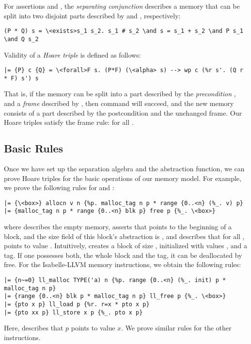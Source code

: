 \documentclass[a4paper,USenglish,cleveref, autoref]{lipics-v2019}
\begin{document}
For assertions  and , the \emph{separating conjunction}  describes a memory that can be split into two disjoint parts described by  and , respectively:
\begin{lstlisting}
(P * Q) s = \<exists>s_1 s_2. s_1 # s_2 \and s = s_1 + s_2 \and P s_1 \and Q s_2
\end{lstlisting}
%
Validity of a \emph{Hoare triple}  is defined as follows:
\begin{lstlisting}
|= {P} c {Q} = \<forall>F s. (P*F) (\<alpha> s) --> wp c (%r s'. (Q r * F) s') s
\end{lstlisting}
That is, if the memory can be split into a part described by the \emph{precondition} , and a \emph{frame} described by ,
then command  will succeed, and the new memory consists of a part described by the postcondition  and the unchanged frame. 
Our Hoare triples satisfy the frame rule:  for all .

\subsection{Basic Rules}
Once we have set up the separation algebra and the abstraction function, we can prove Hoare triples for the basic operations of our memory model.
For example, we prove the following rules for  and :
\begin{lstlisting}
|= {\<box>} allocn v n {%p. malloc_tag n p * range {0..<n} (%_. v) p}
|= {malloc_tag n p * range {0..<n} blk p} free p {%_. \<box>}
\end{lstlisting}
where  describes the empty memory, 
 asserts that  points to the beginning of a block, and the size field of this block's abstraction is , 
and  describes that for all ,  points to value .
Intuitively,  creates a block of size , initialized with values , and a tag. 
If one possesses both, the whole block and the tag, it can be deallocated by free. 
For the Isabelle-LLVM memory instructions, we obtain the following rules:
\begin{lstlisting}
|= {n~=0} ll_malloc TYPE('a) n {%p. range {0..<n} (%_. init) p * malloc_tag n p}
|= {range {0..<n} blk p * malloc_tag n p} ll_free p {%_. \<box>}
|= {pto x p} ll_load p {%r. r=x * pto x p}
|= {pto xx p} ll_store x p {%_. pto x p}
\end{lstlisting}
Here,  describes that $p$ points to value $x$. We prove similar rules for the other instructions.
\end{document}
